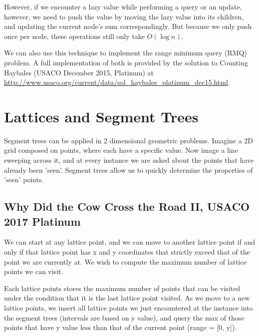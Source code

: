 \documentclass[11pt]{article}
\begin{document}
However, if we encounter a lazy value while performing a query or an update, however, we need to push the value by moving the lazy value into its children, and updating the current node's sum correspondingly. But because we only push once per node, these operations still only take $O(\log n)$.

We can also use this technique to implement the range minimum query (RMQ) problem. A full implementation of both is provided by the solution to Counting Haybales (USACO December 2015, Platinum) at \url{http://www.usaco.org/current/data/sol_haybales_platinum_dec15.html}.

\section{Lattices and Segment Trees}
Segment trees can be applied in 2 dimensional geometric problems. Imagine a 2D grid composed on points, where each have a specific value. Now image a line sweeping across it, and at every instance we are asked about the points that have already been 'seen'. Segment trees allow us to quickly determine the properties of 'seen' points.

\subsection{Why Did the Cow Cross the Road II, USACO 2017 Platinum}
We can start at any lattice point, and we can move to another lattice point if and only if that lattice point has x and y coordinates that strictly exceed that of the point we are currently at. We wish to compute the maximum number of lattice points we can visit.

Each lattice points stores the maximum number of points that can be visited under the condition that it is the last lattice point visited. As we move to a new lattice points, we insert all lattice points we just encountered at the instance into the segment trees (intervals are based on y value), and query the max of those points that have y value less than that of the current point (range = [0, y]).  
\end{document}
